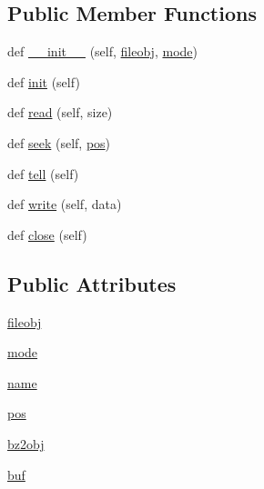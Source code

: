 \subsection*{Public Member Functions}
\begin{DoxyCompactItemize}
\item 
def \hyperlink{classpip_1_1__vendor_1_1distlib_1_1__backport_1_1tarfile_1_1__BZ2Proxy_af733db683932ab0756b7b94f531eb356}{\+\_\+\+\_\+init\+\_\+\+\_\+} (self, \hyperlink{classpip_1_1__vendor_1_1distlib_1_1__backport_1_1tarfile_1_1__BZ2Proxy_a9ae03c9c21f08830847b23508db7ff27}{fileobj}, \hyperlink{classpip_1_1__vendor_1_1distlib_1_1__backport_1_1tarfile_1_1__BZ2Proxy_a38ced0a5ad2b758ee2a4621d4e98a646}{mode})
\item 
def \hyperlink{classpip_1_1__vendor_1_1distlib_1_1__backport_1_1tarfile_1_1__BZ2Proxy_a293e1a2d3f508f048ed1caf7c6d39e29}{init} (self)
\item 
def \hyperlink{classpip_1_1__vendor_1_1distlib_1_1__backport_1_1tarfile_1_1__BZ2Proxy_aee681c3047099c0fd19496a237e58b6b}{read} (self, size)
\item 
def \hyperlink{classpip_1_1__vendor_1_1distlib_1_1__backport_1_1tarfile_1_1__BZ2Proxy_ac20281fcdccbb8ea0d73a5037fb307c1}{seek} (self, \hyperlink{classpip_1_1__vendor_1_1distlib_1_1__backport_1_1tarfile_1_1__BZ2Proxy_a558d7a0c422bf793151c02b7ab798f72}{pos})
\item 
def \hyperlink{classpip_1_1__vendor_1_1distlib_1_1__backport_1_1tarfile_1_1__BZ2Proxy_ac4937671960a4f60961a9cd81fa21910}{tell} (self)
\item 
def \hyperlink{classpip_1_1__vendor_1_1distlib_1_1__backport_1_1tarfile_1_1__BZ2Proxy_af21109baa240198f6952580677e513ea}{write} (self, data)
\item 
def \hyperlink{classpip_1_1__vendor_1_1distlib_1_1__backport_1_1tarfile_1_1__BZ2Proxy_a540eb239b85228776c0e6d66fc42bca1}{close} (self)
\end{DoxyCompactItemize}
\subsection*{Public Attributes}
\begin{DoxyCompactItemize}
\item 
\hyperlink{classpip_1_1__vendor_1_1distlib_1_1__backport_1_1tarfile_1_1__BZ2Proxy_a9ae03c9c21f08830847b23508db7ff27}{fileobj}
\item 
\hyperlink{classpip_1_1__vendor_1_1distlib_1_1__backport_1_1tarfile_1_1__BZ2Proxy_a38ced0a5ad2b758ee2a4621d4e98a646}{mode}
\item 
\hyperlink{classpip_1_1__vendor_1_1distlib_1_1__backport_1_1tarfile_1_1__BZ2Proxy_a9cd9fe86a8523346b4513a3b61ede9fc}{name}
\item 
\hyperlink{classpip_1_1__vendor_1_1distlib_1_1__backport_1_1tarfile_1_1__BZ2Proxy_a558d7a0c422bf793151c02b7ab798f72}{pos}
\item 
\hyperlink{classpip_1_1__vendor_1_1distlib_1_1__backport_1_1tarfile_1_1__BZ2Proxy_a948d1c12c442f64f8a181ef6a07aa6c2}{bz2obj}
\item 
\hyperlink{classpip_1_1__vendor_1_1distlib_1_1__backport_1_1tarfile_1_1__BZ2Proxy_a69aacacfb35f7f8372373dfa543489c8}{buf}
\end{DoxyCompactItemize}
